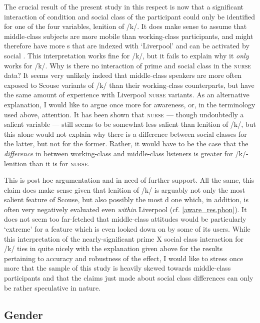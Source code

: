 The crucial result of the present study in this respect is now that a significant interaction of  condition and social class of the participant could only be identified for one of the four variables, lenition of /k/.
It does make sense to assume that middle-class subjects are more mobile than working-class participants, and might therefore have more s that are indexed with `Liverpool' and can be activated by social .
This interpretation works fine for /k/, but it fails to explain why it \emph{only} works for /k/.
Why is there no interaction of prime and social class in the \textsc{nurse} data?
It seems very unlikely indeed that middle-class speakers are more often exposed to Scouse variants of /k/ than their working-class counterparts, but have the same amount of experience with Liverpool \textsc{nurse} variants.
As an alternative explanation, I would like to argue once more for awareness, or, in the terminology used above, attention.
It has been shown that \textsc{nurse} --- though undoubtedly a salient variable --- still seems to be somewhat less salient than lenition of /k/, but this alone would not explain why there is a difference between social classes for the latter, but not for the former.
Rather, it would have to be the case that the \emph{difference} in  between working-class and middle-class listeners is greater for /k/-lenition than it is for \textsc{nurse}.

This is post hoc argumentation and in need of further support.
All the same, this claim does make sense given that lenition of /k/ is arguably not only the most salient feature of Scouse, but also possibly the most d one which, in addition, is often very negatively evaluated even \emph{within} Liverpool (cf. \ref{aware_res.phon}).
It does not seem too far-fetched that middle-class attitudes would be particularly `extreme' for a feature which is even looked down on by some of its users.
While this interpretation of the nearly-significant prime X social class interaction for /k/ ties in quite nicely with the explanation given above for the results pertaining to accuracy and robustness of the  effect, I would like to stress once more that the sample of this study is heavily skewed towards middle-class participants and that the claims just made about social class differences can only be rather speculative in nature.

		\subsection{Gender}


